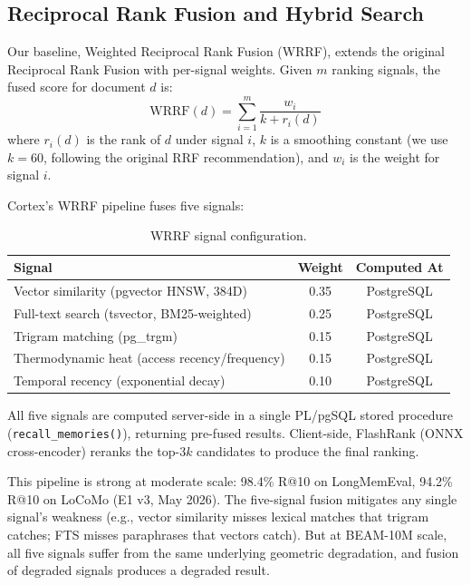 \documentclass[11pt]{article}
\newcommand{\eg}{e.g.}
\begin{document}
\subsection{Reciprocal Rank Fusion and Hybrid Search}
\label{sec:rrf}

Our baseline, Weighted Reciprocal Rank Fusion (WRRF), extends the
original Reciprocal Rank Fusion \citep{Cormack2009} with per-signal
weights.  Given $m$ ranking signals, the fused score for document $d$
is:
\begin{equation}
\text{WRRF}(d) = \sum_{i=1}^{m} \frac{w_i}{k + r_i(d)}
\label{eq:wrrf}
\end{equation}
where $r_i(d)$ is the rank of $d$ under signal $i$, $k$ is a
smoothing constant (we use $k = 60$, following the original RRF
recommendation), and $w_i$ is the weight for signal $i$.

Cortex's WRRF pipeline fuses five signals:

\begin{table}[h]
\centering
\caption{WRRF signal configuration.}
\label{tab:wrrf-signals}
\begin{tabular}{lcc}
\toprule
Signal & Weight & Computed At \\
\midrule
Vector similarity (pgvector HNSW, 384D) & 0.35 & PostgreSQL \\
Full-text search (tsvector, BM25-weighted) & 0.25 & PostgreSQL \\
Trigram matching (pg\_trgm) & 0.15 & PostgreSQL \\
Thermodynamic heat (access recency/frequency) & 0.15 & PostgreSQL \\
Temporal recency (exponential decay) & 0.10 & PostgreSQL \\
\bottomrule
\end{tabular}
\end{table}

All five signals are computed server-side in a single PL/pgSQL stored
procedure (\texttt{recall\_memories()}), returning pre-fused results.
Client-side, FlashRank (ONNX cross-encoder) reranks the top-$3k$
candidates to produce the final ranking.

This pipeline is strong at moderate scale: 98.4\% R@10 on
LongMemEval, 94.2\% R@10 on LoCoMo (E1 v3, May 2026).  The five-signal fusion
mitigates any single signal's weakness (\eg, vector similarity
misses lexical matches that trigram catches; FTS misses paraphrases
that vectors catch).  But at BEAM-10M scale, all five signals suffer
from the same underlying geometric degradation, and fusion of
degraded signals produces a degraded result.
\end{document}
